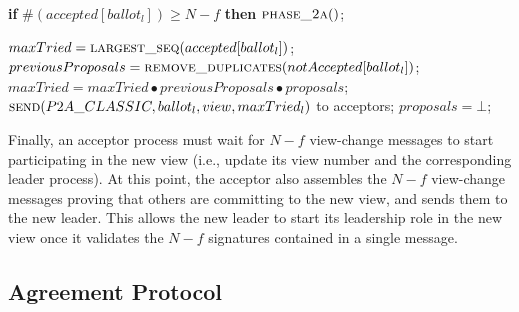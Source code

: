 \begin{algorithm}
\begin{algorithmic}[1]
		\State 
		\State \hspace{\algorithmicindent}\hspace{\algorithmicindent} \textbf{if} $\#(accepted[ballot_l]) \geq N-f$ \textbf{then} 
		\State \hspace{\algorithmicindent}\hspace{\algorithmicindent}\hspace{\algorithmicindent} $\Call{phase\_2a}{ }$;
		
		\State
		\State $maxTried = \Call{largest\_seq}{accepted[ballot_l]}$;
		\State $previousProposals = \Call{remove\_duplicates}{notAccepted[ballot_l]}$;
		\State $maxTried = maxTried \bullet previousProposals \bullet proposals$;
		\State $\Call{send}{P2A\_CLASSIC,ballot_l,view, maxTried_l}$ to acceptors;
		\State $proposals = \bot$;
		\EndFunction
		
	\end{algorithmic}
\end{algorithm}

Finally, an acceptor process must wait for $N-f$ view-change messages to start participating in the new view (i.e., update its view number and the corresponding leader process). At this point, the acceptor also assembles the $N-f$ view-change messages proving that others are committing to the new view, and sends them to the new leader. This allows the new leader to start its leadership role in the new view once it validates the $N-f$ signatures contained in a single message.

\subsection{Agreement Protocol} 

